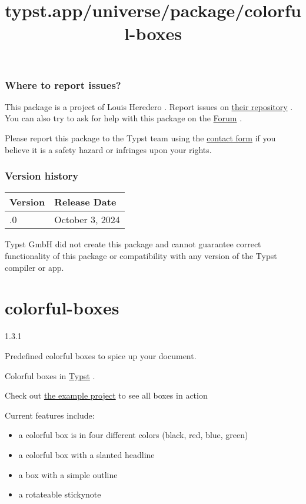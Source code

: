 \subsubsection{Where to report issues?}\label{where-to-report-issues}

This package is a project of Louis Heredero . Report issues on
\href{https://git.kb28.ch/HEL/rivet-typst}{their repository} . You can
also try to ask for help with this package on the
\href{https://forum.typst.app}{Forum} .

Please report this package to the Typst team using the
\href{https://typst.app/contact}{contact form} if you believe it is a
safety hazard or infringes upon your rights.

\label{versions}
\subsubsection{Version history}\label{version-history}

\begin{longtable}[]{@{}ll@{}}
\toprule\noalign{}
Version & Release Date \\
\midrule\noalign{}
\endhead
\bottomrule\noalign{}
\endlastfoot
0.1.0 & October 3, 2024 \\
\end{longtable}

Typst GmbH did not create this package and cannot guarantee correct
functionality of this package or compatibility with any version of the
Typst compiler or app.


\title{typst.app/universe/package/colorful-boxes}

\label{banner}
\section{colorful-boxes}\label{colorful-boxes}

{ 1.3.1 }

Predefined colorful boxes to spice up your document.

\label{readme}
Colorful boxes in \href{https://github.com/typst/typst}{Typst} .

Check out \href{https://typst.app/project/rp9q3upfc69bPUCbv0BjzX}{the
example project} to see all boxes in action

Current features include:

\begin{itemize}
\tightlist
\item
  a colorful box is in four different colors (black, red, blue, green)
\item
  a colorful box with a slanted headline
\item
  a box with a simple outline
\item
  a rotateable stickynote
\end{itemize}

